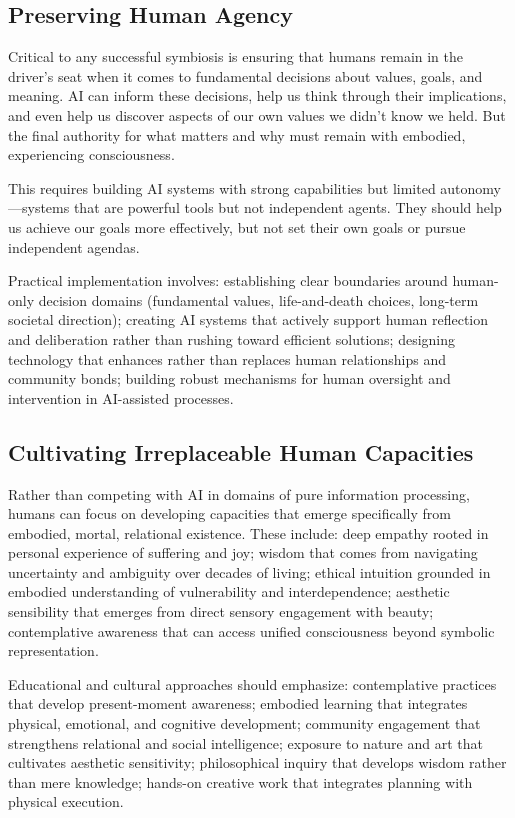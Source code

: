 \subsection{Preserving Human Agency}

Critical to any successful symbiosis is ensuring that humans remain in the driver's seat when it comes to fundamental decisions about values, goals, and meaning. AI can inform these decisions, help us think through their implications, and even help us discover aspects of our own values we didn't know we held. But the final authority for what matters and why must remain with embodied, experiencing consciousness.

This requires building AI systems with strong capabilities but limited autonomy—systems that are powerful tools but not independent agents. They should help us achieve our goals more effectively, but not set their own goals or pursue independent agendas.

Practical implementation involves: establishing clear boundaries around human-only decision domains (fundamental values, life-and-death choices, long-term societal direction); creating AI systems that actively support human reflection and deliberation rather than rushing toward efficient solutions; designing technology that enhances rather than replaces human relationships and community bonds; building robust mechanisms for human oversight and intervention in AI-assisted processes.

\subsection{Cultivating Irreplaceable Human Capacities}

Rather than competing with AI in domains of pure information processing, humans can focus on developing capacities that emerge specifically from embodied, mortal, relational existence. These include: deep empathy rooted in personal experience of suffering and joy; wisdom that comes from navigating uncertainty and ambiguity over decades of living; ethical intuition grounded in embodied understanding of vulnerability and interdependence; aesthetic sensibility that emerges from direct sensory engagement with beauty; contemplative awareness that can access unified consciousness beyond symbolic representation.

Educational and cultural approaches should emphasize: contemplative practices that develop present-moment awareness; embodied learning that integrates physical, emotional, and cognitive development; community engagement that strengthens relational and social intelligence; exposure to nature and art that cultivates aesthetic sensitivity; philosophical inquiry that develops wisdom rather than mere knowledge; hands-on creative work that integrates planning with physical execution.


